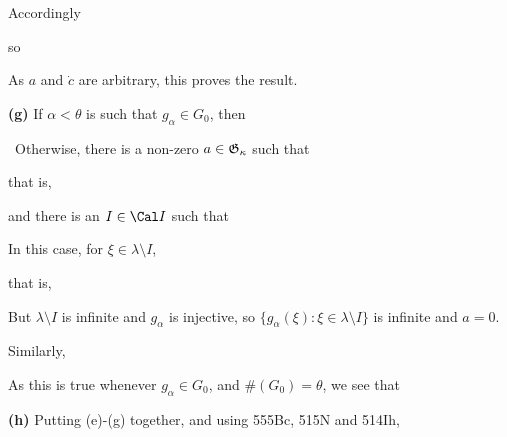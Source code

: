 {\noindent Accordingly


\noindent so


\noindent As $a$ and $\dot c$ are arbitrary, this proves the result.\ \Qed

\medskip

{\bf (g)} If $\alpha<\theta$ is such that $g_{\alpha}\in G_0$, then


\noindent\Prf\Quer\ Otherwise, there is a non-zero
$a\in\frak G_{\kappa}$ such that


\noindent that is,


\noindent and there is an $I\in\Cal I$ such that


\noindent In this case, for $\xi\in\lambda\setminus I$,


\noindent that is,


\noindent But $\lambda\setminus I$ is infinite and $g_{\alpha}$ is
injective, so $\{g_{\alpha}(\xi):\xi\in\lambda\setminus I\}$ is infinite
and $a=0$.\ \Bang\Qed

Similarly,


\noindent As this is true whenever $g_{\alpha}\in G_0$, and
$\#(G_0)=\theta$, we see that


\medskip

{\bf (h)} Putting (e)-(g) together, and using 555Bc, 515N and 514Ih,


}%

